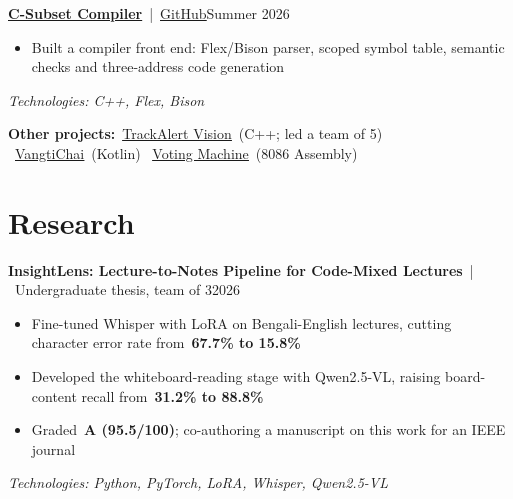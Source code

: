 \documentclass[10pt]{article}
\providecommand{\pdffakespace}{}                        %
\newcommand{\ssp}{\pdffakespace\ }                      %
\newcommand{\sep}{\ssp\textcolor{muted}{|}\ssp}                         %
\newcommand{\link}[2]{\href{#1}{\textcolor{linkc}{\underline{#2}}}}     %
\newcommand{\entry}[3]{\textbf{#1}\sep #2\pdffakespace\hfill\textcolor{muted}{#3}\par} %
\newcommand{\tech}[1]{{\leftskip=13pt\textit{\textcolor{muted}{Technologies: #1}}\par}}
\newcommand{\gap}{\vspace{3.5pt}}
\begin{document}
\gap
\entry{\href{https://github.com/ahsanauddry027/CSE420_CompilerDesign}{C-Subset Compiler}}{\link{https://github.com/ahsanauddry027/CSE420_CompilerDesign}{GitHub}}{Summer 2026}
\begin{itemize}
  \item Built a compiler front end: Flex/Bison parser, scoped symbol table, semantic checks and three-address code generation
\end{itemize}
\tech{C++, Flex, Bison}
\gap
\textbf{Other projects:}\ssp\link{https://github.com/ahsanauddry027/CSE461_project_TrackAlert}{TrackAlert Vision}\ssp(C++; led a team of 5) \textperiodcentered\ssp\link{https://github.com/ahsanauddry027/VhangtiChai_AndroidApp_CSE489}{VangtiChai}\ssp(Kotlin) \textperiodcentered\ssp\link{https://github.com/ahsanauddry027/CSE341_Project_Fall2025}{Voting Machine}\ssp(8086 Assembly)\par

\section{Research}
\entry{InsightLens: Lecture-to-Notes Pipeline for Code-Mixed Lectures}{Undergraduate thesis, team of 3}{2026}
\begin{itemize}
  \item Fine-tuned Whisper with LoRA on Bengali-English lectures, cutting character error rate from\ssp\textbf{67.7\% to 15.8\%}
  \item Developed the whiteboard-reading stage with Qwen2.5-VL, raising board-content recall from\ssp\textbf{31.2\% to 88.8\%}
  \item Graded\ssp\textbf{A (95.5/100)}; co-authoring a manuscript on this work for an IEEE journal
\end{itemize}
\tech{Python, PyTorch, LoRA, Whisper, Qwen2.5-VL}
\end{document}
